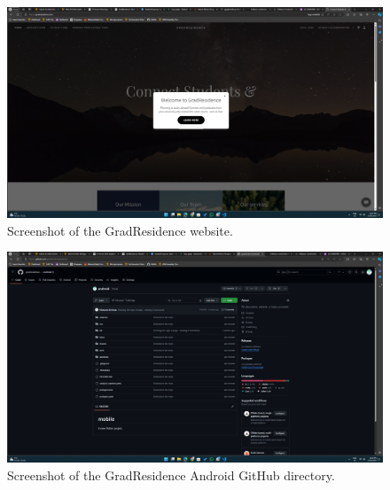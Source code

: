 \documentclass{article}
\begin{document}
\begin{figure}[ht!]
    \centering
    \includegraphics[width=\textwidth, height=0.4\textheight, keepaspectratio]{../gradResidence.png}
    \caption{Screenshot of the GradResidence website.}
    \label{fig:gradResidence}
\end{figure}

\vspace{1cm}

\begin{figure}[ht!]
    \centering
    \includegraphics[width=\textwidth, height=0.4\textheight, keepaspectratio]{../gradResidence_Android.png}
    \caption{Screenshot of the GradResidence Android GitHub directory.}
    \label{fig:gradResidenceAndroid}
\end{figure}

\vspace{1cm}
\end{document}
